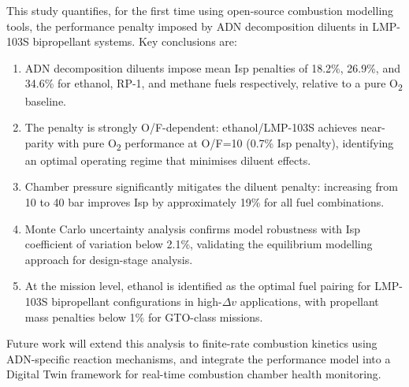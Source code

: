 \documentclass[review]{elsarticle}
\begin{document}
This study quantifies, for the first time using 
open-source combustion modelling tools, the performance 
penalty imposed by ADN decomposition diluents in 
LMP-103S bipropellant systems. 
Key conclusions are:

\begin{enumerate}
\item ADN decomposition diluents impose mean Isp 
penalties of 18.2\%, 26.9\%, and 34.6\% for ethanol, 
RP-1, and methane fuels respectively, relative to a 
pure O\textsubscript{2} baseline.

\item The penalty is strongly O/F-dependent: 
ethanol/LMP-103S achieves near-parity with pure 
O\textsubscript{2} performance at O/F=10 
(0.7\% Isp penalty), identifying an optimal 
operating regime that minimises diluent effects.

\item Chamber pressure significantly mitigates the 
diluent penalty: increasing from 10 to 40 bar 
improves Isp by approximately 19\% for all fuel 
combinations.

\item Monte Carlo uncertainty analysis confirms 
model robustness with Isp coefficient of variation 
below 2.1\%, validating the equilibrium modelling 
approach for design-stage analysis.

\item At the mission level, ethanol is identified 
as the optimal fuel pairing for LMP-103S bipropellant 
configurations in high-$\Delta v$ applications, 
with propellant mass penalties below 1\% for 
GTO-class missions.
\end{enumerate}

Future work will extend this analysis to finite-rate 
combustion kinetics using ADN-specific reaction 
mechanisms, and integrate the performance model 
into a Digital Twin framework for real-time 
combustion chamber health monitoring.
\end{document}
